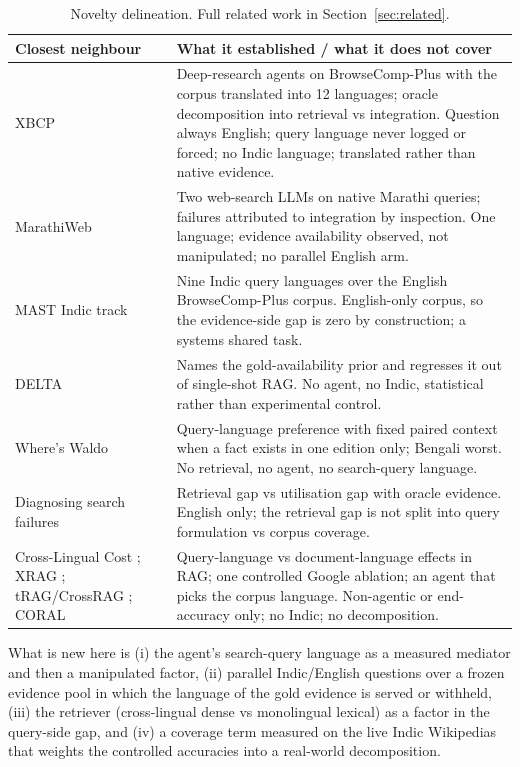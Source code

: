 \begin{table}[h]
\small
\centering
\begin{tabular}{p{3.6cm}p{9.6cm}}
\toprule
\textbf{Closest neighbour} & \textbf{What it established / what it does not cover} \\
\midrule
XBCP \citep{a2606_15345} & Deep-research agents on BrowseComp-Plus with the corpus translated into 12 languages; oracle decomposition into retrieval vs integration. Question always English; query language never logged or forced; no Indic language; translated rather than native evidence. \\
MarathiWeb \citep{kale2026marathiweb} & Two web-search LLMs on native Marathi queries; failures attributed to integration by inspection. One language; evidence availability observed, not manipulated; no parallel English arm. \\
MAST Indic track \citep{mast2026} & Nine Indic query languages over the English BrowseComp-Plus corpus. English-only corpus, so the evidence-side gap is zero by construction; a systems shared task. \\
DELTA \citep{a2601_02956} & Names the gold-availability prior and regresses it out of single-shot RAG. No agent, no Indic, statistical rather than experimental control. \\
Where's Waldo \citep{a2610_00606} & Query-language preference with fixed paired context when a fact exists in one edition only; Bengali worst. No retrieval, no agent, no search-query language. \\
Diagnosing search failures \citep{a2608_01913} & Retrieval gap vs utilisation gap with oracle evidence. English only; the retrieval gap is not split into query formulation vs corpus coverage. \\
Cross-Lingual Cost \citep{a2507_07543}; XRAG \citep{a2505_10089}; tRAG/CrossRAG \citep{a2504_03616}; CORAL \citep{a2604_25676} & Query-language vs document-language effects in RAG; one controlled Google ablation; an agent that picks the corpus language. Non-agentic or end-accuracy only; no Indic; no decomposition. \\
\bottomrule
\end{tabular}
\caption{Novelty delineation. Full related work in Section~\ref{sec:related}.}
\label{tab:delineation}
\end{table}

What is new here is (i) the agent's search-query language as a measured mediator and then a manipulated factor, (ii) parallel Indic/English questions over a frozen evidence pool in which the language of the gold evidence is served or withheld, (iii) the retriever (cross-lingual dense vs monolingual lexical) as a factor in the query-side gap, and (iv) a coverage term measured on the live Indic Wikipedias that weights the controlled accuracies into a real-world decomposition.


